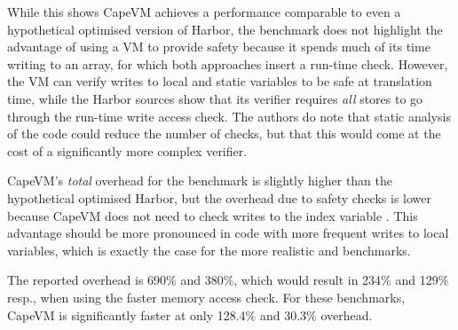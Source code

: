 While this shows CapeVM achieves a performance comparable to even a hypothetical optimised version of Harbor, the  benchmark does not highlight the advantage of using a VM to provide safety because it spends much of its time writing to an array, for which both approaches insert a run-time check. However, the VM can verify writes to local and static variables to be safe at translation time, while the Harbor sources \cite{sos-operating-system} show that its verifier requires \emph{all} stores to go through the run-time write access check. The authors do note that static analysis of the code could reduce the number of checks, but that this would come at the cost of a significantly more complex verifier.

CapeVM's \emph{total} overhead for the  benchmark is slightly higher than the hypothetical optimised Harbor, but the overhead due to safety checks is lower because CapeVM does not need to check writes to the index variable . This advantage should be more pronounced in code with more frequent writes to local variables, which is exactly the case for the more realistic  and  benchmarks. 

The reported overhead is 690\% and 380\%, which would result in 234\% and 129\% resp., when using the faster memory access check. For these benchmarks, CapeVM is significantly faster at only 128.4\% and 30.3\% overhead.
